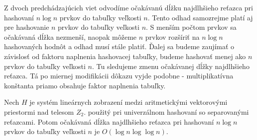 Z dvoch predchádzajúcich viet odvodíme očakávanú dĺžku najdlhšieho reťazca pri hashovaní $n \log n$ prvkov do tabuľky veľkosti $n$. Tento odhad samozrejme platí aj pre hashovanie $n$ prvkov do tabuľky veľkosti $n$. S menším počtom prvkov sa očakávaná dĺžka nezmenší, naopak môžeme $n$ prvkov rozšíriť na $n \log n$ hashovaných hodnôt a odhad musí stále platiť. Ďalej sa budeme zaujímať o závislosť od faktoru naplnenia hashovacej tabuľky, budeme hashovať menej ako $n$ prvkov do tabuľky veľkosti $n$. Tu sledujeme zmenu očakávanej dĺžky najdlhšieho reťazca. Tá po miernej modifikácii dôkazu vyjde podobne - multiplikatívna konštanta priamo obsahuje faktor naplnenia tabuľky.

\begin{theorem}
\label{theorem-n-logn-to-n}
Nech $H$ je systém lineárnych zobrazení medzi aritmetickými vektorovými priestormi nad telesom $Z_2$. použitý pri univerzálnom hashovaní so separovanými reťazcami. Potom očakávaná dĺžka najdlhšieho reťazca pri hashovaní $n \log n$ prvkov do tabuľky veľkosti $n$ je $O(\log n \log \log n)$.
\end{theorem}
